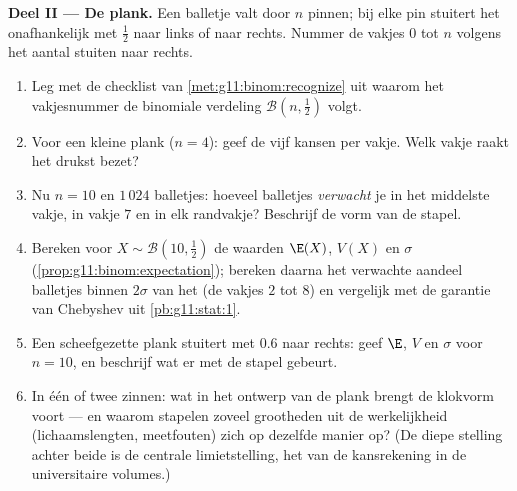 \begin{problem}
\medskip
\noindent\textbf{Deel II --- De plank.}
Een balletje valt door $n$  pinnen; bij elke pin stuitert het
onafhankelijk met  $\frac12$ naar links of naar rechts. Nummer de vakjes
$0$ tot $n$ volgens het aantal stuiten naar rechts.
\begin{enumerate}[resume]
  \item Leg met de checklist van \cref{met:g11:binom:recognize} uit waarom het
        vakjesnummer de binomiale verdeling
        $\mathcal B\!\left(n, \frac12\right)$ volgt.
  \item Voor een kleine plank ($n = 4$): geef de vijf kansen per vakje. Welk
        vakje raakt het drukst bezet?
  \item Nu $n = 10$ en $1\,024$ balletjes: hoeveel balletjes \emph{verwacht}
        je in het middelste vakje, in vakje $7$ en in elk randvakje?
        Beschrijf de vorm van de stapel.
  \item Bereken voor $X \sim \mathcal B\!\left(10, \frac12\right)$ de waarden
        $\E(X)$, $V(X)$ en $\sigma$ (\cref{prop:g11:binom:expectation});
        bereken daarna het verwachte aandeel balletjes binnen $2\sigma$ van
        het  (de vakjes $2$ tot $8$) en vergelijk met de garantie van
        Chebyshev uit \cref{pb:g11:stat:1}.
  \item Een scheefgezette plank stuitert met  $0.6$ naar rechts: geef
        $\E$, $V$ en $\sigma$ voor $n = 10$, en beschrijf wat er met de stapel
        gebeurt.
  \item In één of twee zinnen: wat in het ontwerp van de plank brengt de
        klokvorm voort --- en waarom stapelen zoveel grootheden uit de
        werkelijkheid (lichaamslengten, meetfouten) zich op dezelfde manier
        op? (De diepe stelling achter beide is de centrale limietstelling, het
         van de kansrekening in de universitaire volumes.)
\end{enumerate}


\end{problem}

